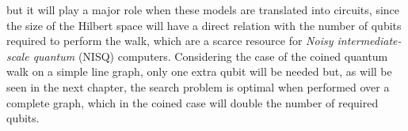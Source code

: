 \documentclass[../../dissertation.tex]{subfiles}
\begin{document}
but it will play a major role when these models are translated into circuits,
since the size of the Hilbert space will have a direct relation with the number
of qubits required to perform the walk, which are a scarce resource for
\textit{Noisy intermediate-scale quantum} (NISQ) computers. Considering the
case of the coined quantum walk on a simple line graph, only one extra qubit
will be needed but, as will be seen in the next chapter, the search problem is
optimal when performed over a complete graph, which in the coined case will
double the number of required qubits. 
\end{document}

